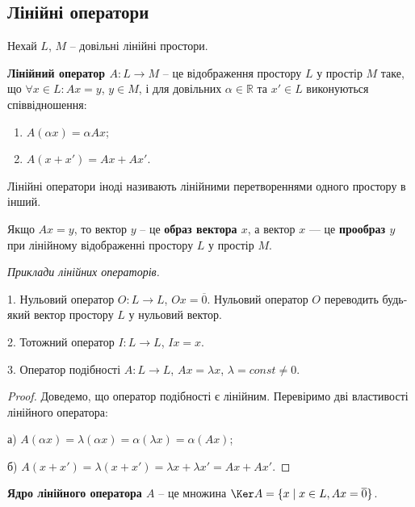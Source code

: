 \subsection{Лінійні оператори}

Нехай $L$, $M$ -- довільні лінійні простори.

\begin{definition}
	\textbf{Лінійний оператор $A: L \rightarrow M$} -- це відображення простору
	$L$ у простір $M$ таке, що $\forall x \in L: Ax = y$, $y \in M$, і для довільних $\alpha \in \mathbb{R}$ та $x' \in L$
	виконуються співвідношення: 
	\begin{enumerate}
		\item $A(\alpha x) = \alpha A x$;
		\item $A(x + x') = A x + A x'$.
	\end{enumerate}
\end{definition}

Лінійні оператори іноді називають лінійними перетвореннями одного
простору в інший.

\begin{definition}
	Якщо $Ax = y$, то вектор $y$ -- це \textbf{образ вектора $x$}, а вектор $x$
	--- це \textbf{прообраз $y$} при лінійному відображенні простору $L$ у простір $M$.
\end{definition}

\textit{Приклади лінійних операторів.}
\begin{example}
	1. Нульовий оператор $O: L \rightarrow L$, $Ox = \overline{0}$. Нульовий оператор $O$ переводить будь-який вектор простору $L$ у нульовий вектор.
	
	2. Тотожний оператор $I: L \rightarrow L$, $Ix = x$.

	3. Оператор подібності $A: L \rightarrow L$, $Ax = \lambda x$, $\lambda = const \neq 0$.
\end{example}

\begin{proof}
	Доведемо, що оператор подібності є лінійним. Перевіримо дві властивості лінійного оператора:
	
	а) $A(\alpha x) = \lambda(\alpha x) = \alpha(\lambda x) = \alpha(A x)$;

	б) $A(x + x') = \lambda(x + x') = \lambda x + \lambda x' = A x + A x'$.
\end{proof}

\begin{definition}
	\textbf{Ядро лінійного оператора $A$} -- це множина
	$\Ker A = \{x \mid x \in L, Ax = \overline{0}\}$.
\end{definition}

